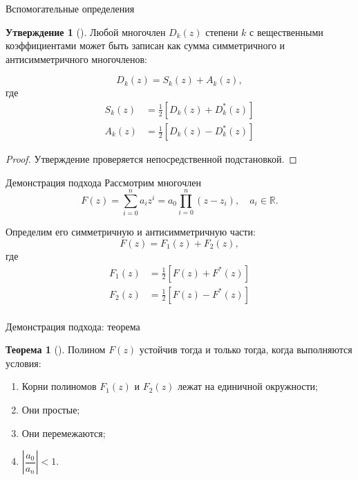 \documentclass[notheorems,aspectratio=169]{beamer}
\theoremstyle{definition}
\newtheorem{theorem}{Теорема}
\newtheorem{proposition}{Утверждение}
\newcommand{\abs}[1]{\left| #1 \right|}
\newcommand{\paren}[1]{\left(#1\right)}
\begin{document}
\begin{frame}{Вспомогательные определения}
  \begin{proposition}[{\cite{Bistritz1984}}]
    Любой многочлен $D_k(z)$ степени $k$ с вещественными коэффициентами
    может быть записан как сумма симметричного и антисимметричного многочленов:

    \begin{equation*}
      D_k(z) = S_k(z) + A_k(z),
    \end{equation*}
    где
    \begin{equation*}
      \begin{aligned}
        S_k(z) &= \frac{1}{2} \left[ D_k(z) + D_k^*(z) \right] \\
        A_k(z) &= \frac{1}{2} \left[ D_k(z) - D_k^*(z) \right]
      \end{aligned}
    \end{equation*}
  \end{proposition}

  \begin{proof}
    Утверждение проверяется непосредственной подстановкой.
  \end{proof}
\end{frame}

\begin{frame}{Демонстрация подхода}
  Рассмотрим многочлен
  \begin{equation*}
    F(z) = \sum_{i=0}^n a_{i} z^i = a_0 \prod_{i=0}^n \paren{z - z_i}, \quad a_i \in \mathbb{R}.
  \end{equation*}

  Определим его симметричную и антисимметричную части:
  \begin{equation*}
    F(z) = F_1(z) + F_2(z),
  \end{equation*}
  где
  \begin{equation*}
    \begin{aligned}
      F_1(z) &= \frac{1}{2} \left[ F(z) + F^*(z) \right] \\
      F_2(z) &= \frac{1}{2} \left[ F(z) - F^*(z) \right] \\
    \end{aligned}
  \end{equation*}
\end{frame}

\begin{frame}{Демонстрация подхода: теорема}
  \begin{theorem}[{\cite{Gnanasekaran1981,Schussler1976}}]
    Полином $F(z)$ устойчив тогда и только тогда, когда выполняются условия:
    \begin{enumerate}
    \item Корни полиномов $F_1(z)$ и $F_2(z)$ лежат на единичной окружности;
    \item Они простые;
    \item Они перемежаются;
    \item $\abs{\dfrac{a_0}{a_n}} < 1$.
    \end{enumerate}
  \end{theorem}

\end{frame}
\end{document}
